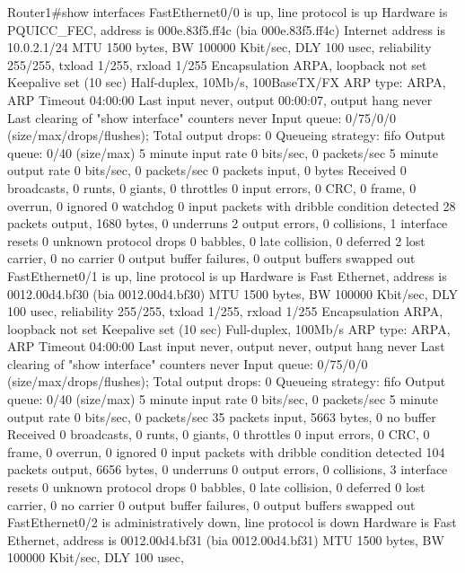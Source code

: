 Router1#show interfaces
FastEthernet0/0 is up, line protocol is up 
  Hardware is PQUICC_FEC, address is 000e.83f5.ff4c (bia 000e.83f5.ff4c)
  Internet address is 10.0.2.1/24
  MTU 1500 bytes, BW 100000 Kbit/sec, DLY 100 usec, 
     reliability 255/255, txload 1/255, rxload 1/255
  Encapsulation ARPA, loopback not set
  Keepalive set (10 sec)
  Half-duplex, 10Mb/s, 100BaseTX/FX
  ARP type: ARPA, ARP Timeout 04:00:00
  Last input never, output 00:00:07, output hang never
  Last clearing of "show interface" counters never
  Input queue: 0/75/0/0 (size/max/drops/flushes); Total output drops: 0
  Queueing strategy: fifo
  Output queue: 0/40 (size/max)
  5 minute input rate 0 bits/sec, 0 packets/sec
  5 minute output rate 0 bits/sec, 0 packets/sec
     0 packets input, 0 bytes
     Received 0 broadcasts, 0 runts, 0 giants, 0 throttles
     0 input errors, 0 CRC, 0 frame, 0 overrun, 0 ignored
     0 watchdog
     0 input packets with dribble condition detected
     28 packets output, 1680 bytes, 0 underruns
     2 output errors, 0 collisions, 1 interface resets
     0 unknown protocol drops
     0 babbles, 0 late collision, 0 deferred
     2 lost carrier, 0 no carrier
     0 output buffer failures, 0 output buffers swapped out
FastEthernet0/1 is up, line protocol is up 
  Hardware is Fast Ethernet, address is 0012.00d4.bf30 (bia 0012.00d4.bf30)
  MTU 1500 bytes, BW 100000 Kbit/sec, DLY 100 usec, 
     reliability 255/255, txload 1/255, rxload 1/255
  Encapsulation ARPA, loopback not set
  Keepalive set (10 sec)
  Full-duplex, 100Mb/s
  ARP type: ARPA, ARP Timeout 04:00:00
  Last input never, output never, output hang never
  Last clearing of "show interface" counters never
  Input queue: 0/75/0/0 (size/max/drops/flushes); Total output drops: 0
  Queueing strategy: fifo
  Output queue: 0/40 (size/max)
  5 minute input rate 0 bits/sec, 0 packets/sec
  5 minute output rate 0 bits/sec, 0 packets/sec
     35 packets input, 5663 bytes, 0 no buffer
     Received 0 broadcasts, 0 runts, 0 giants, 0 throttles
     0 input errors, 0 CRC, 0 frame, 0 overrun, 0 ignored
     0 input packets with dribble condition detected
     104 packets output, 6656 bytes, 0 underruns
     0 output errors, 0 collisions, 3 interface resets
     0 unknown protocol drops
     0 babbles, 0 late collision, 0 deferred
     0 lost carrier, 0 no carrier
     0 output buffer failures, 0 output buffers swapped out
FastEthernet0/2 is administratively down, line protocol is down 
  Hardware is Fast Ethernet, address is 0012.00d4.bf31 (bia 0012.00d4.bf31)
  MTU 1500 bytes, BW 100000 Kbit/sec, DLY 100 usec, 
